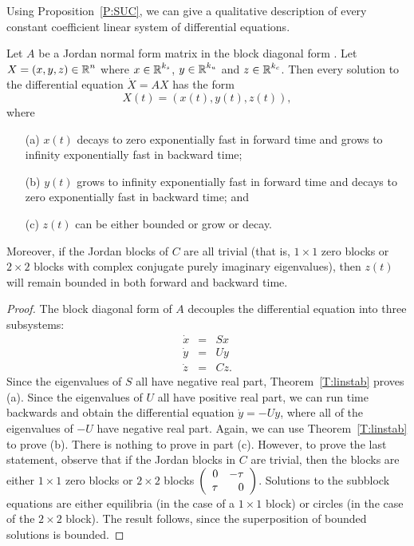 \documentclass{ximera}
\begin{document}
Using Proposition~\ref{P:SUC}, we can give a qualitative description of 
every constant coefficient linear system of differential equations.
\begin{theorem}  \label{T:SUC}
Let $A$ be a Jordan normal form matrix in the block diagonal form .
Let $X=(x,y,z)\in\mbox{$\Bbb{R}$}^n$ where $x\in\mbox{$\Bbb{R}$}^{k_s}$, $y\in\mbox{$\Bbb{R}$}^{k_u}$ and $z\in\mbox{$\Bbb{R}$}^{k_c}$.
Then every solution to the differential equation $\dot{X}=AX$ has the form
\[
X(t) = (x(t), y(t),z(t)),
\]
where
\begin{itemize}
\item[(a)]  $x(t)$ decays to zero exponentially fast in 
	forward time and grows to 
	infinity exponentially fast in backward time;
\item[(b)]  $y(t)$ grows to infinity exponentially fast in forward time and 
	decays to zero exponentially fast in backward time; and
\item[(c)]  $z(t)$ can be either bounded or grow or decay. 
\end{itemize}
Moreover, if the Jordan blocks of $C$ are all trivial
(that is, $1\times 1$ zero blocks or $2\times 2$ blocks with complex
conjugate purely imaginary eigenvalues), then $z(t)$ will remain bounded in 
both forward and backward time. 
\end{theorem}

\begin{proof}  The block diagonal form of $A$ decouples the differential equation 
into three subsystems:
\begin{eqnarray*}
\dot{x} & = & Sx \\
\dot{y} & = & Uy \\
\dot{z} & = & Cz.
\end{eqnarray*}  
Since the eigenvalues of $S$ all have negative real part, Theorem~\ref{T:linstab} proves (a).  Since the eigenvalues of $U$ all have 
positive real part, we can run time backwards and obtain the differential 
equation $\dot{y}=-Uy$, where all of the eigenvalues of $-U$ have negative 
real part.  Again, we can use Theorem~\ref{T:linstab} to prove (b).  There 
is nothing to prove in part (c).  However, to prove the last statement, observe
that if the Jordan blocks in $C$ are trivial, then the blocks are either
$1\times 1$ zero blocks or $2\times 2$ blocks $\left(\begin{array}{rr} 0 & -\tau\\ \tau &0\end{array}\right)$.
Solutions to the subblock equations are either equilibria (in the case of a
$1\times 1$ block) or circles (in the case of the $2\times 2$ block).  The
result follows, since the superposition of bounded solutions is bounded. \end{proof}
\end{document}
